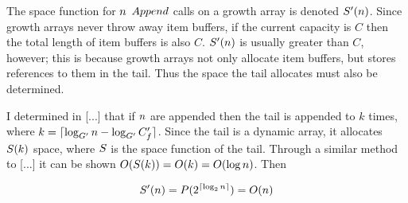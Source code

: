 \scomplex

The space function for $n$ $Append$ calls on a growth array is denoted $S'(n)$. Since growth arrays never throw away item buffers, if the current capacity is $C$ then the total length of item buffers is also $C$. $S'(n)$ is usually greater than $C$, however; this is because growth arrays not only allocate item buffers, but stores references to them in the tail. Thus the space the tail allocates must also be determined.

I determined in [...] that if $n$ are appended then the tail is appended to $k$ times, where $k = \lceil \log_{G'} n - \log_{G'} C_f' \rceil$. Since the tail is a dynamic array, it allocates $S(k)$ space, where $S$ is the space function of the tail. Through a similar method to [...] it can be shown $O(S(k)) = O(k) = O(\log n)$. Then %

\begin{align*}
S'(n) = P(2^{\lceil \log_2 n \rceil}) = O(n)
\end{align*}
